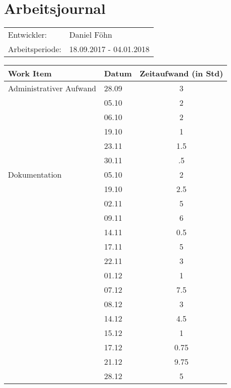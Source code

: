 \documentclass[a4paper, 10pt, fleqn]{article}
\newcommand{\header}{\textbf{Work Item}&\textbf{Datum}&\textbf{Zeitaufwand (in Std)}\\\toprule}
\begin{document}
	\section*{Arbeitsjournal}
    \begin{tabular}{ll}
        Entwickler: & Daniel Föhn \\
        Arbeitsperiode: & 18.09.2017 - 04.01.2018\\
    \end{tabular}
	\begin{longtable}{p{9cm}|p{2cm}|c}
        \header

        Administrativer Aufwand & 28.09 & 3\\
        & 05.10 & 2\\
        & 06.10 & 2\\
        & 19.10 & 1\\
        & 23.11 & 1.5\\
        & 30.11 & .5\\
        
        Dokumentation & 05.10 & 2\\
        & 19.10 & 2.5\\
        & 02.11 & 5\\
        & 09.11 & 6\\
        & 14.11 & 0.5\\
        & 17.11 & 5\\
        & 22.11 & 3\\
        & 01.12 & 1\\
        & 07.12 & 7.5\\
        & 08.12 & 3\\
        & 14.12 & 4.5\\
        & 15.12 & 1\\
        & 17.12 & 0.75\\
        & 21.12 & 9.75\\
        & 28.12 & 5\\
        

\end{longtable}
\end{document}
